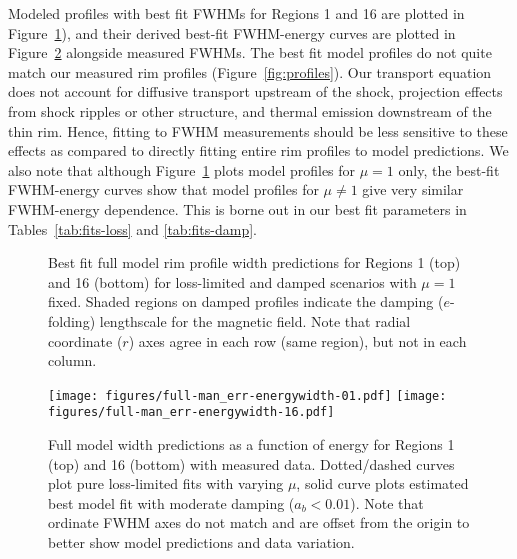 \documentclass[iop, apj, numberedappendix]{emulateapj}
\begin{document}
Modeled profiles with best fit FWHMs for Regions 1 and 16 are plotted in
Figure~\ref{fig:rims}), and their derived best-fit FWHM-energy curves
are plotted in Figure~\ref{fig:fits} alongside measured FWHMs.
The best fit model profiles do not quite match our measured rim profiles
(Figure~\ref{fig:profiles}).  Our transport equation does not account for
diffusive transport upstream of the shock, projection effects from shock
ripples or other structure, and thermal emission downstream of the thin rim.
Hence, fitting to FWHM measurements should be less sensitive to these effects
as compared to directly fitting entire rim profiles to model predictions.
We also note that although Figure~\ref{fig:rims} plots model profiles for
$\mu = 1$ only, the best-fit FWHM-energy curves show that model profiles for
$\mu \neq 1$ give very similar FWHM-energy dependence.  This is borne out in
our best fit parameters in Tables~\ref{tab:fits-loss} and \ref{tab:fits-damp}.

\begin{figure}
    \centering
    \caption{Best fit full model rim profile width predictions for Regions 1
        (top) and 16 (bottom) for loss-limited and damped scenarios with
        $\mu = 1$ fixed.  Shaded regions on damped profiles indicate the
        damping ($e$-folding) lengthscale for the magnetic field.  Note that
        radial coordinate ($r$) axes agree in each row (same region), but not
        in each column.
    \label{fig:rims}}
\end{figure}

\begin{figure}
    \centering
    \texttt{[image: figures/full-man\_err-energywidth-01.pdf]}
    \texttt{[image: figures/full-man\_err-energywidth-16.pdf]}
    \caption{Full model width predictions as a function of energy for Regions 1
    (top) and 16 (bottom) with measured data.  Dotted/dashed curves plot
    pure loss-limited fits with varying $\mu$, solid curve plots estimated best
    model fit with moderate damping ($a_b < 0.01$).  Note that ordinate FWHM
    axes do not match and are offset from the origin to better show model
    predictions and data variation.
    \label{fig:fits}}
\end{figure}
\end{document}
